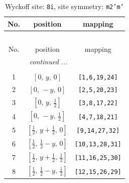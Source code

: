 \documentclass[fleqn,8pt]{jsarticle}
\begin{document}
\begin{longtable}{ccc}
\caption{Wyckoff site: {\tt 8i}, site symmetry: {\tt m2'm'}}
 \\
 \hline \hline
No. & position & mapping \\ \hline \endfirsthead

\multicolumn{2}{l}{\tablename\ \thetable{}} \\
 \hline \hline
No. & position & mapping \\ \hline \endhead

 \hline \hline
\multicolumn{2}{r}{\footnotesize\it continued ...} \\ \endfoot

 \hline \hline
\multicolumn{2}{r}{} \\ \endlastfoot

1 & $\left[ 0,\, y,\, 0 \right]$ & {\tt [1,6,19,24]} \\ \hline
2 & $\left[ 0,\, - y,\, 0 \right]$ & {\tt [2,5,20,23]} \\ \hline
3 & $\left[ 0,\, y,\, \frac{1}{2} \right]$ & {\tt [3,8,17,22]} \\ \hline
4 & $\left[ 0,\, - y,\, \frac{1}{2} \right]$ & {\tt [4,7,18,21]} \\ \hline
5 & $\left[ \frac{1}{2},\, y + \frac{1}{2},\, 0 \right]$ & {\tt [9,14,27,32]} \\ \hline
6 & $\left[ \frac{1}{2},\, \frac{1}{2} - y,\, 0 \right]$ & {\tt [10,13,28,31]} \\ \hline
7 & $\left[ \frac{1}{2},\, y + \frac{1}{2},\, \frac{1}{2} \right]$ & {\tt [11,16,25,30]} \\ \hline
8 & $\left[ \frac{1}{2},\, \frac{1}{2} - y,\, \frac{1}{2} \right]$ & {\tt [12,15,26,29]} \\
\end{longtable}
\renewcommand{\arraystretch}{1.2}
\end{document}
